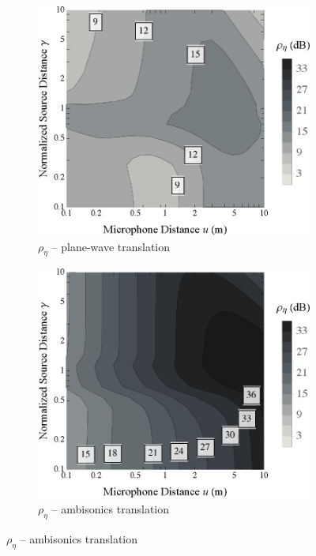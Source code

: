 \begin{figure}[tbp]
	\vspace{0.5cm}
	\begin{subfigure}[b]{0.49\textwidth}
        		\includegraphics[width=\textwidth]{07_characterization_extrapolation/figures/scharer2009_contour_pwt.eps}
        		\caption{$\rho_\eta$ -- plane-wave translation}
        		\label{fig:07_Characterization_Extrapolation:Spectral_Errors:PWT}
    	\end{subfigure}
	\hfill
    	\begin{subfigure}[b]{0.49\textwidth}
        		\includegraphics[width=\textwidth]{07_characterization_extrapolation/figures/scharer2009_contour_sre.eps}
        		\caption{$\rho_\eta$ -- ambisonics translation}
        		\label{fig:07_Characterization_Extrapolation:Spectral_Errors:SRE}
    	\end{subfigure}
	

\end{figure}
